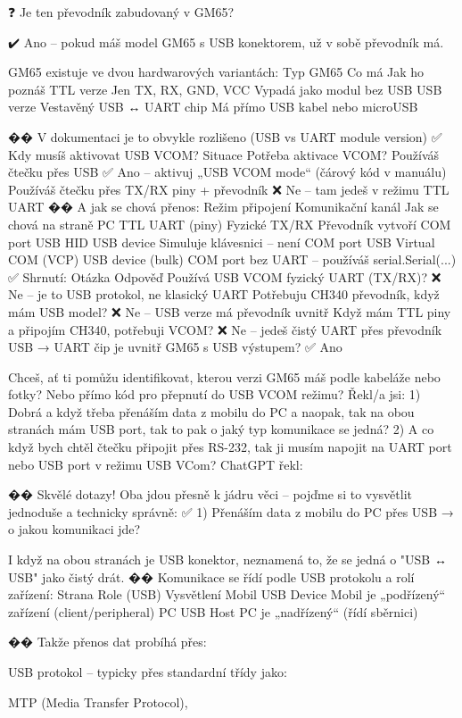 ❓ Je ten převodník zabudovaný v GM65?

    ✔️ Ano – pokud máš model GM65 s USB konektorem, už v sobě převodník má.

GM65 existuje ve dvou hardwarových variantách:
Typ GM65	Co má	Jak ho poznáš
TTL verze	Jen TX, RX, GND, VCC	Vypadá jako modul bez USB
USB verze	Vestavěný USB ↔ UART chip	Má přímo USB kabel nebo microUSB

�� V dokumentaci je to obvykle rozlišeno (USB vs UART module version)
✅ Kdy musíš aktivovat USB VCOM?
Situace	Potřeba aktivace VCOM?
Používáš čtečku přes USB	✅ Ano – aktivuj „USB VCOM mode“ (čárový kód v manuálu)
Používáš čtečku přes TX/RX piny + převodník	❌ Ne – tam jedeš v režimu TTL UART
�� A jak se chová přenos:
Režim připojení	Komunikační kanál	Jak se chová na straně PC
TTL UART (piny)	Fyzické TX/RX	Převodník vytvoří COM port
USB HID	USB device	Simuluje klávesnici – není COM port
USB Virtual COM (VCP)	USB device (bulk)	COM port bez UART – používáš serial.Serial(...)
✅ Shrnutí:
Otázka	Odpověď
Používá USB VCOM fyzický UART (TX/RX)?	❌ Ne – je to USB protokol, ne klasický UART
Potřebuju CH340 převodník, když mám USB model?	❌ Ne – USB verze má převodník uvnitř
Když mám TTL piny a připojím CH340, potřebuji VCOM?	❌ Ne – jedeš čistý UART přes převodník
USB → UART čip je uvnitř GM65 s USB výstupem?	✅ Ano

Chceš, ať ti pomůžu identifikovat, kterou verzi GM65 máš podle kabeláže nebo fotky? Nebo přímo kód pro přepnutí do USB VCOM režimu?
Řekl/a jsi:
1) Dobrá a když třeba přenáším data z mobilu do PC a naopak, tak na obou stranách mám USB port, tak to pak o jaký typ komunikace se jedná?
2) A co když bych chtěl čtečku připojit přes RS-232, tak ji musím napojit na UART port nebo USB port v režimu USB VCom?
ChatGPT řekl:

�� Skvělé dotazy! Oba jdou přesně k jádru věci – pojďme si to vysvětlit jednoduše a technicky správně:
✅ 1) Přenáším data z mobilu do PC přes USB → o jakou komunikaci jde?

I když na obou stranách je USB konektor, neznamená to, že se jedná o "USB ↔ USB" jako čistý drát.
�� Komunikace se řídí podle USB protokolu a rolí zařízení:
Strana	Role (USB)	Vysvětlení
Mobil	USB Device	Mobil je „podřízený“ zařízení (client/peripheral)
PC	USB Host	PC je „nadřízený“ (řídí sběrnici)

�� Takže přenos dat probíhá přes:

    USB protokol – typicky přes standardní třídy jako:

        MTP (Media Transfer Protocol),

